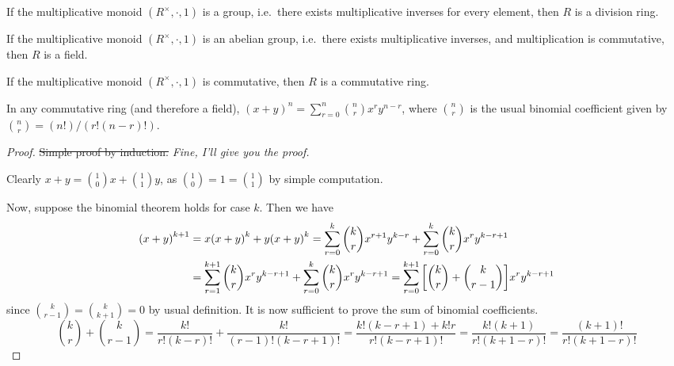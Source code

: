\begin{definition}
    If the multiplicative monoid \((R^\times,\cdot,1)\) is a group,
    i.e.\ there exists multiplicative inverses for every element,
    then \(R\) is a division ring.
\end{definition}
\begin{definition}
    If the multiplicative monoid \((R^\times,\cdot,1)\) is an abelian group,
    i.e.\ there exists multiplicative inverses,
    and multiplication is commutative,
    then \(R\) is a field.
\end{definition}
\begin{definition}
    If the multiplicative monoid \((R^\times,\cdot,1)\) is commutative,
    then \(R\) is a commutative ring.
\end{definition}
\begin{proposition}\label{prop:binom}
    In any commutative ring (and therefore a field),
    \({(x+y)}^n = \sum_{r=0}^n \binom{n}{r} x^r y^{n-r}\),
    where \(\binom{n}{r}\) is the usual binomial coefficient
    given by \(\binom{n}{r} = (n!)/(r!(n-r)!)\).
\end{proposition}
\begin{proof}
    \sout{Simple proof by induction.}
    \textit{Fine, I'll give you the proof.}

    Clearly \(x+y = \binom{1}{0}x + \binom{1}{1}y\),
    as \(\binom{1}{0} = 1 = \binom{1}{1}\) by simple computation.

    Now, suppose the binomial theorem holds for case \(k\).
    Then we have
    \begin{align*}
        {(x+y)}^{k+1} &= x{(x+y)}^k + y{(x+y)}^k
        = \sum_{r=0}^k \binom{k}{r} x^{r+1} y^{k-r}
        + \sum_{r=0}^k \binom{k}{r} x^r y^{k-r+1} \\
        &= \sum_{r=1}^{k+1} \binom{k}{r} x^r y^{k-r+1}
        + \sum_{r=0}^k \binom{k}{r} x^r y^{k-r+1}
        = \sum_{r=0}^{k+1} \qty[\binom{k}{r}+\binom{k}{r-1}]x^r y^{k-r+1}
    \end{align*}
    since \(\binom{k}{r-1} = \binom{k}{k+1} = 0\) by usual definition.
    It is now sufficient to prove the sum of binomial coefficients.
    \begin{equation*}
        \binom{k}{r}+\binom{k}{r-1}
        = \frac{k!}{r!(k-r)!} + \frac{k!}{(r-1)!(k-r+1)!}
        = \frac{k!(k-r+1) + k!r}{r!(k-r+1)!}
        = \frac{k!(k+1)}{r!(k+1-r)!}
        = \frac{(k+1)!}{r!(k+1-r)!}
    \end{equation*}
\end{proof}

